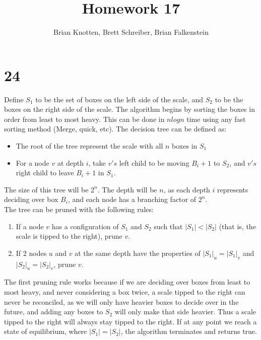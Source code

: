 \documentclass[letterpaper,notitlepage,twoside]{article}
\begin{document}
\title{Homework 17}
\author{Brian Knotten, Brett Schreiber, Brian Falkenstein}
\maketitle

\section*{24}
Define $S_1$ to be the set of boxes on the left side of the scale, and $S_2$ to be the boxes on the right side of the scale. The algorithm begins by sorting the boxes in order from least to most heavy. This can be done in $nlogn$ time using any fast sorting method (Merge, quick, etc). 
The decision tree can be defined as:
\begin{itemize}
\item The root of the tree represent the scale with all $n$ boxes in $S_1$
\item For a node $v$ at depth $i$, take $v's$ left child to be moving $B_i+1$ to $S_2$, and $v's$ right child to leave $B_i+1$ in $S_1$. 
\end{itemize}
The size of this tree will be $2^n$. The depth will be $n$, as each depth $i$ represents deciding over box $B_i$, and each node has a branching factor of $2^n$. \\
The tree can be pruned with the following rules:
\begin{enumerate}
\item If a node $v$ has a configuration of $S_1$ and $S_2$ such that $|S_1|<|S_2|$ (that is, the scale is tipped to the right), prune $v$. 
\item If 2 nodes $u$ and $v$ at the same depth have the properties of $|S_1|_u = |S_1|_v$ and $|S_2|_u = |S_2|_v$, prune $v$.  
\end{enumerate}
The first pruning rule works because if we are deciding over boxes from least to most heavy, and never considering a box twice, a scale tipped to the right can never be reconciled, as we will only have heavier boxes to decide over in the future, and adding any boxes to $S_2$ will only make that side heavier. Thus a scale tipped to the right will always stay tipped to the right. If at any point we reach a state of equilibrium, where $|S_1| = |S_2|$, the algorithm terminates and returns true. 
\end{document}
